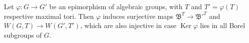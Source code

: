 Let $\varphi: G \rightarrow G'$ be an epimorphism of algebraic groups, with $T$ and $T' = \varphi(T)$ respective maximal tori. Then $\varphi$ induces surjective maps $\mathfrak{B}^T \rightarrow \mathfrak{B}'^T$ and $W(G, T) \rightarrow W(G', T')$, which are also injective in case $\operatorname{Ker} \varphi$ lies in all Borel subgroups of $G$.
